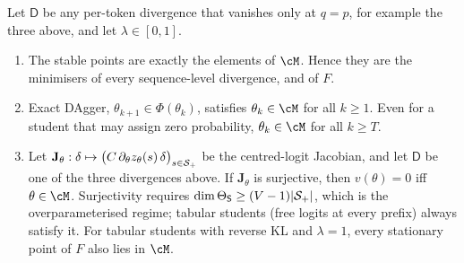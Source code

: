 \begin{theorem}\label{thm:fp-real}
 Let $\mathsf D$ be any per-token divergence that vanishes only at $q=p$, for example the three above, and
let $\lambda\in[0,1]$.
\begin{enumerate}[label=(\roman*),nosep]
\item The stable points are exactly the elements of $\cM$. Hence they are the minimisers of every sequence-level
divergence, and of $F$.
\item Exact DAgger, $\theta_{k+1}\in\Phi(\theta_k)$, satisfies $\theta_k\in\cM$ for all $k\ge1$. Even for a student that may assign zero
probability, $\theta_k\in\cM$ for all $k\ge T$.
\item Let $\mathbf J_\theta:\delta\mapsto\big(C\,\partial_\theta z_\theta(s)\,\delta\big)_{s\in\mathcal{S}_+}$ be the centred-logit Jacobian, and let $\mathsf D$ be one of the three
divergences above. If $\mathbf J_\theta$ is surjective, then $v(\theta)=0$ iff $\theta\in\cM$. Surjectivity requires
$\dim\Theta_{\mathsf{S}}\ge(V-1)|\mathcal{S}_+|$, which is the overparameterised regime; tabular students (free logits at every prefix) always
satisfy it. For tabular students with reverse KL and $\lambda=1$, every stationary point of $F$ also lies in $\cM$.
\end{enumerate}
\end{theorem}
